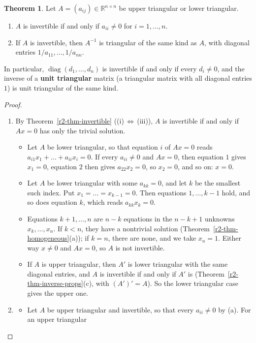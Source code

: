\documentclass[12pt]{article}
\newcommand{\R}{\mathbb R}
\DeclareMathOperator{\diag}{diag}
\theoremstyle{definition}
\newtheorem{theorem}{Theorem}
\begin{document}
\begin{theorem}\label{r2-thm-triangular}
Let \(A=(a_{ij})\in\R^{n\times n}\) be upper triangular or lower triangular.
\begin{enumerate}
\item \(A\) is invertible if and only if \(a_{ii}\ne0\) for \(i=1,\dots,n\).
\item If \(A\) is invertible, then \(A^{-1}\) is triangular of the same kind as \(A\), with diagonal entries
\(1/a_{11},\dots,1/a_{nn}\).
\end{enumerate}
In particular, \(\diag(d_1,\dots,d_n)\) is invertible if and only if every \(d_i\ne0\), and the inverse of a
\textbf{unit triangular} matrix (a triangular matrix with all diagonal entries \(1\)) is unit triangular of the
same kind.
\end{theorem}
\begin{proof}
\begin{enumerate}
\item By Theorem~\ref{r2-thm-invertible} ((i)\,\(\Leftrightarrow\)\,(iii)), \(A\) is invertible if and only if
\(Ax=0\) has only the trivial solution.
\begin{itemize}
\item Let \(A\) be lower triangular, so that equation \(i\) of \(Ax=0\) reads \(a_{i1}x_1+\dots+a_{ii}x_i=0\). If
every \(a_{ii}\ne0\) and \(Ax=0\), then equation \(1\) gives \(x_1=0\), equation \(2\) then gives
\(a_{22}x_2=0\), so \(x_2=0\), and so on: \(x=0\).
\item Let \(A\) be lower triangular with some \(a_{kk}=0\), and let \(k\) be the smallest such index. Put
\(x_1=\dots=x_{k-1}=0\). Then equations \(1,\dots,k-1\) hold, and so does equation \(k\), which reads
\(a_{kk}x_k=0\).
\item Equations \(k+1,\dots,n\) are \(n-k\) equations in the \(n-k+1\) unknowns \(x_k,\dots,x_n\). If \(k<n\),
they have a nontrivial solution (Theorem~\ref{r2-thm-homogeneous}(a)); if \(k=n\), there are none, and we take
\(x_n=1\). Either way \(x\ne0\) and \(Ax=0\), so \(A\) is not invertible.
\item If \(A\) is upper triangular, then \(A'\) is lower triangular with the same diagonal entries, and \(A\) is
invertible if and only if \(A'\) is (Theorem~\ref{r2-thm-inverse-props}(c), with \((A')'=A\)). So the lower
triangular case gives the upper one.
\end{itemize}
\item
\begin{itemize}
\item Let \(A\) be upper triangular and invertible, so that every \(a_{ii}\ne0\) by (a). For an upper triangular

\end{itemize}
\end{enumerate}
\end{proof}
\end{document}
